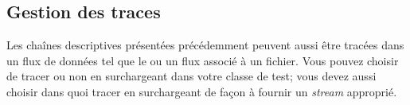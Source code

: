 \documentclass[a4paper,10pt,twoside]{book}
\begin{document}
\subsection{Gestion des traces}
Les chaînes descriptives présentées précédemment peuvent aussi être tracées dans un flux de données  tel que le  ou un flux associé à un fichier. Vous pouvez choisir de tracer ou non en surchargeant  dans votre classe de test; vous devez aussi choisir dans quoi tracer en surchargeant  de façon à fournir un \emph{stream} approprié.

\end{document}

